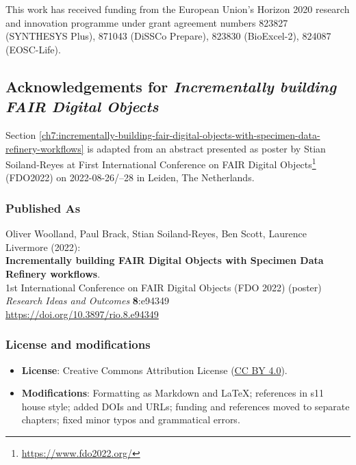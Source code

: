 This work has received funding from the European Union's Horizon 2020
research and innovation programme under grant agreement numbers 823827
(SYNTHESYS Plus), 871043 (DiSSCo Prepare), 823830 (BioExcel-2), 824087
(EOSC-Life).




\subsection{Acknowledgements for \emph{Incrementally building FAIR Digital Objects}}\label{ch11:incrementally-fdo}

Section \vref{ch7:incrementally-building-fair-digital-objects-with-specimen-data-refinery-workflows}  is adapted from an abstract
presented as poster by Stian Soiland-Reyes at 
First International Conference on FAIR Digital Objects\footnote{\url{https://www.fdo2022.org/}}
(FDO2022) on
2022-08-26/--28 in Leiden, The Netherlands. 

\subsubsection*{Published As}

Oliver Woolland, Paul Brack, Stian Soiland-Reyes, Ben Scott, Laurence
Livermore (2022):\\
\textbf{Incrementally building FAIR Digital Objects with Specimen Data
Refinery workflows}.\\
1st International Conference on FAIR Digital Objects
(FDO 2022) (poster)\\
\emph{Research Ideas and Outcomes} \textbf{8}:e94349\\
\url{https://doi.org/10.3897/rio.8.e94349}



\subsubsection*{License and modifications}

\begin{itemize}
\tightlist
\item
  \textbf{License}: Creative Commons Attribution License
  (\href{https://spdx.org/licenses/CC-BY-4.0}{CC BY 4.0}).
\item
  \textbf{Modifications}: Formatting as Markdown and LaTeX; references in s11 house style; added DOIs and URLs; funding and references moved to separate chapters; fixed minor typos and grammatical errors.
\end{itemize}



